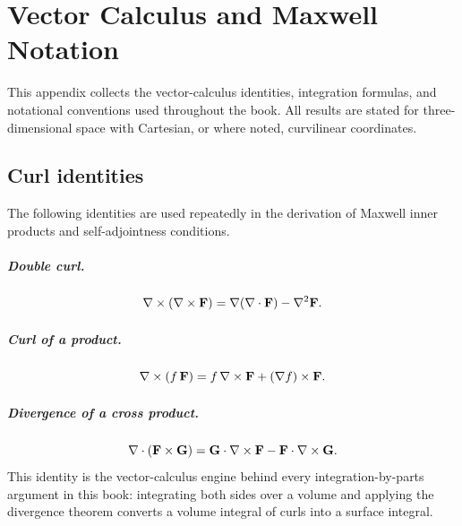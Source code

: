 \chapter{Vector Calculus and Maxwell Notation}
\label{app:vector}

This appendix collects the vector-calculus identities, integration
formulas, and notational conventions used throughout the book. All
results are stated for three-dimensional space with Cartesian, or
where noted, curvilinear coordinates.


\section{Curl identities}
\label{sec:curl-identities}

The following identities are used repeatedly in the derivation of
Maxwell inner products and self-adjointness conditions.

\paragraph{Double curl.}
\begin{equation}
 \nabla\times(\nabla\times\mathbf{F}) = \nabla(\nabla\cdot\mathbf{F}) - \nabla^2\mathbf{F}.
 \label{eq:double-curl}
\end{equation}

\paragraph{Curl of a product.}
\begin{equation}
 \nabla\times(f\,\mathbf{F}) = f\,\nabla\times\mathbf{F} + (\nabla f)\times\mathbf{F}.
 \label{eq:curl-product}
\end{equation}

\paragraph{Divergence of a cross product.}
\begin{equation}
 \nabla\cdot(\mathbf{F} \times \mathbf{G}) = \mathbf{G}\cdot\nabla\times\mathbf{F} - \mathbf{F}\cdot\nabla\times\mathbf{G}.
 \label{eq:div-cross}
\end{equation}
This identity is the vector-calculus engine behind every
integration-by-parts argument in this book: integrating both sides over
a volume and applying the divergence theorem converts a volume integral
of curls into a surface integral.


